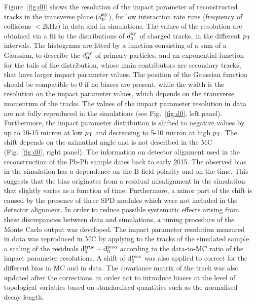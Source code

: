 Figure~\ref{fig:d0} shows the resolution of the impact parameter of reconstructed tracks 
in the transverse plane ($d_{\rm 0}^{\rm xy}$), for low interaction rate runs (frequency of collisions $<2$kHz) in data and in simulations.
The values of the resolution are obtained via a fit to the distributions of $d_{\rm 0}^{\rm xy}$ 
of charged tracks, in the different $p_{\rm T}$ intervals. The histograms are fitted by a function consisting of a sum
of a Gaussian, to describe the $d_{\rm 0}^{\rm xy}$ of primary particles, and an exponential
function for the tails of the distribution, whose main contributors are secondary tracks,
that have larger impact parameter values. The position of the Gaussian function
should be compatible to 0 if no biases are present, while the width is
the resolution on the impact parameter values, which depends on the transverse momentum of the tracks.
The values of the impact parameter resolution in data are not fully reproduced
in the simulations (see Fig.~\ref{fig:d0}, left panel).
Furthermore, the impact parameter distribution is shifted to negative 
values by up to 10-15 micron at low $p_{\rm T}$ and 
decreasing to 5-10 micron at high $p_{\rm T}$. The shift 
depends on the azimuthal angle and is not described 
in the MC (Fig.~\ref{fig:d0}, right panel). 
The information on detector alignment used in the reconstruction of the Pb-Pb sample dates back to early 2015.
The observed bias in the simulation has a dependence on the B field polarity and on the time.
This suggests that the bias originates from a residual misalignment in the simulation
that slightly varies as a function of time. Furthermore, a minor part of the shift is caused
by the presence of three SPD modules which were not included in the detector alignment.
In order to reduce possible systematic effects arising from these discrepancies
between data and simulations, a tuning procedure of the Monte Carlo output
was developed.
 The impact parameter resolution measured in data 
 was reproduced in MC by applying to the tracks of the simulated sample a scaling of 
the residuals ${\rm d}_0^{\rm true}-{\rm d}_0^{\rm reco}$ 
 according to the data-to-MC ratio of the impact parameter 
 resolutions. A shift of d$_0^{\rm reco}$ was also applied to correct for the different bias in MC and in data.
 The covariance matrix of the track was also
 updated after the corrections, in order not to introduce biases at the level
 of topological variables based on standardised quantities such as the normalised decay length. \\
 


